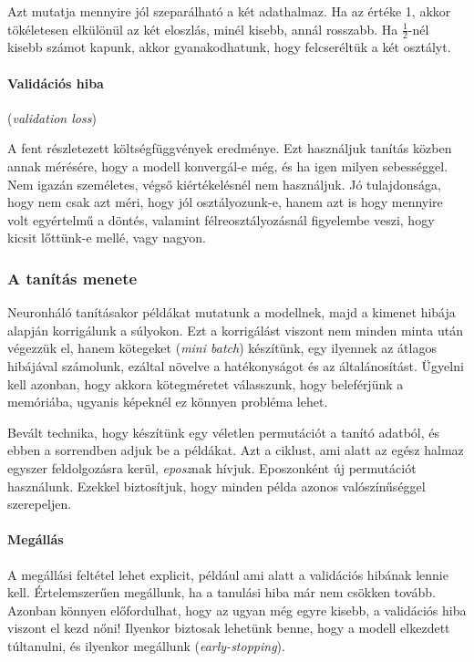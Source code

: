 Azt mutatja mennyire jól szeparálható a két adathalmaz. 
Ha az értéke 1, akkor tökéletesen elkülönül az két eloszlás, 
minél kisebb, annál rosszabb. Ha $ \frac{1}{2} $-nél kisebb számot kapunk,
akkor gyanakodhatunk, hogy felcseréltük a két osztályt.

\paragraph{Validációs hiba} (\textit{validation loss})

A fent részletezett költségfüggvények eredménye. Ezt használjuk
tanítás közben annak mérésére, hogy a modell konvergál-e még,
és ha igen milyen sebességgel. Nem igazán személetes, végső kiértékelésnél
nem használjuk. Jó tulajdonsága, hogy nem csak azt méri, hogy jól
osztályozunk-e, hanem azt is hogy mennyire volt egyértelmű a döntés,
valamint félreosztályozásnál figyelembe veszi, hogy kicsit lőttünk-e
mellé, vagy nagyon.



\subsubsection{A tanítás menete}

Neuronháló tanításakor példákat mutatunk a modellnek, majd a kimenet
hibája alapján korrigálunk a súlyokon. Ezt a korrigálást viszont nem
minden minta után végezzük el, hanem kötegeket (\textit{mini batch}) 
készítünk, egy ilyennek az átlagos hibájával számolunk, ezáltal 
növelve a hatékonyságot és az általánosítást. Ügyelni kell azonban, hogy
akkora kötegméretet válasszunk, hogy beleférjünk a memóriába, ugyanis 
képeknél ez könnyen probléma lehet.


Bevált technika, hogy készítünk egy véletlen permutációt a tanító adatból,
és ebben a sorrendben adjuk be a példákat. Azt a ciklust, ami alatt 
az egész halmaz egyszer feldolgozásra kerül, \textit{eposz}nak hívjuk.
Eposzonként új permutációt használunk. Ezekkel biztosítjuk, hogy minden
példa azonos valószínűséggel szerepeljen.

\paragraph{Megállás}

A megállási feltétel lehet explicit, például ami alatt a validációs hibának
lennie kell. Értelemszerűen megállunk, ha a tanulási hiba már nem csökken tovább.
Azonban könnyen előfordulhat, hogy az ugyan még egyre kisebb, a validációs hiba
viszont el kezd nőni! Ilyenkor biztosak lehetünk benne, hogy a modell elkezdett
túltanulni, és ilyenkor megállunk (\textit{early-stopping}).



